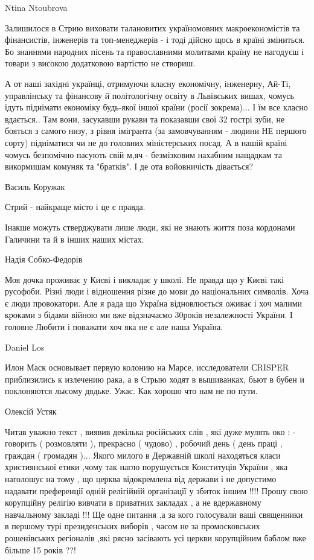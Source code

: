 Ntina Ntoubrova

Залишилося в Стрию виховати талановитих україномовних макроекономістів та
фінансистів, інженерів та топ-менеджерів - і тоді дійсно щось в країні
зміниться. Бо знаннями народних пісень та православними молитвами країну не
нагодуєш і товари з високою додатковою вартістю не створиш.

А от наші західні українці, отримуючи класну економічну, інженерну, Ай-Ті,
управлінську та фінансову й політологічну освіту в Львівських вишах, чомусь
їдуть піднімати економіку будь-якої іншої країни (росії зокрема)... І їм все
класно вдається.. Там вони, засукавши рукави та показавши свої 32 гострі зуби,
не бояться з самого низу, з рівня імігранта (за замовчуванням - людини НЕ
першого сорту) підніматися чи не до головних міністерських посад. А в нашій
країні чомусь безпомічно пасують свій м,яч - безмізковим нахабним нащадкам та
викормишам комуняк та "братків". І де ота войовничість дівається?

Василь Коружак

Стрий - найкраще місто і це є правда.

Інакше можуть стверджувати лише люди, які не знають життя поза кордонами
Галичини та й в інших наших містах.

Надія Собко-Федорів

Моя дочка проживає у Києві і викладає у школі. Не правда що у Києві такі
русофоби. Різні люди і відношення різне до мови до національних символів. Хоча
є люди провокатори. Але я рада що Україна відновлюється оживає і хоч малими
кроками з бідами війною ми вже відзначаємо 30років незалежності України. І
головне Любити і поважати хоч яка не є але наша Україна.

Daniel Los

Илон Маск основывает первую колонию на Марсе, исследователи СRISPER
приблизились к излечению рака, а в Стрыю ходят в вышиванках, бьют в бубен и
поклоняются лысому дядьке. Ужас. Как хорошо что нам не по пути.

Олексій Устяк

Читав уважно текст , виявив декілька російських слів , які дуже мулять око : -
говорить ( розмовляти ), прекрасно ( чудово) , робочий день ( день праці ,
граждан ( громадян )...  Якого милого в Державній школі находяться класи
християнської етики ,чому так нагло порушується Конституція України , яка
наголошує на тому , що церква відокремлена від держави і не допустимо надавати
преференції одній релігійній організації у збиток іншим !!!!  Прошу свою
корупційну релігію вивчати в приватних закладах , а не вдержавному навчальному
закладі !!!  Ще одне питання ,а за кого голосували ваші священники в першому
турі президенських виборів , часом не за промосковських рошенівських регіоналів
,які рясно засівають усі церкви корупційним баблом вже більше 15 років ??!

